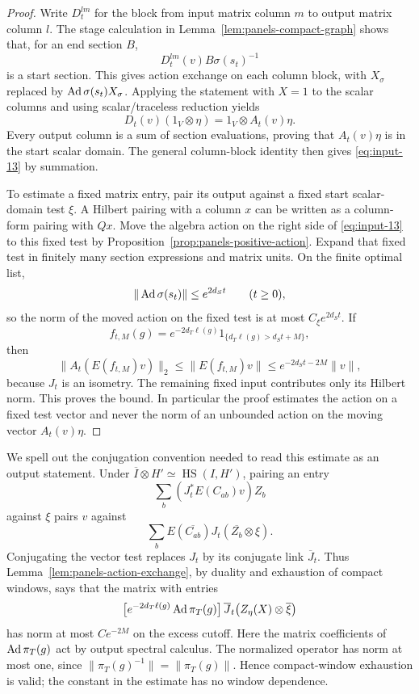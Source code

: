 \begin{proof}
Write $D_t^{lm}$ for the block from input matrix column $m$ to output
matrix column $l$.  The stage calculation in
Lemma~\ref{lem:panels-compact-graph} shows that, for an end section $B$,
\[
 D_t^{lm}(v)B\sigma(s_t)^{-1}
\]
is a start section.  This gives action exchange on each column block,
with $X_\sigma$ replaced by
$\operatorname{Ad}\sigma(s_t)X_\sigma$.  Applying the statement with $X=1$ to the
scalar columns and using scalar/traceless reduction yields
\[
 D_t(v)(1_V\otimes\eta)=1_V\otimes A_t(v)\eta.
\]
Every output column is a sum of section evaluations, proving that
$A_t(v)\eta$ is in the start scalar domain.  The general column-block
identity then gives \eqref{eq:input-13} by summation.

To estimate a fixed matrix entry, pair its output against a fixed
start scalar-domain test $\xi$.  A Hilbert pairing with a column $x$
can be written as a column-form pairing with $Qx$.  Move the algebra
action on the right side of \eqref{eq:input-13} to this fixed test by
Proposition~\ref{prop:panels-positive-action}.  Expand that fixed test
in finitely many section expressions and matrix units.  On the finite
optimal list,
\[
 \|\operatorname{Ad}\sigma(s_t)\|\leq e^{2d_St}\qquad(t\geq0),
\]
so the norm of the moved action on the fixed test is at most
$C_\xi e^{2d_St}$.  If
\[
 f_{t,M}(g)=e^{-2d_T\ell(g)}
             1_{\{d_T\ell(g)>d_St+M\}},
\]
then
\[
 \|A_t(E(f_{t,M})v)\|_2
 \leq\|E(f_{t,M})v\|
 \leq e^{-2d_St-2M}\|v\|,
\]
because $J_t$ is an isometry.  The remaining fixed input contributes
only its Hilbert norm.  This proves the bound.  In particular the proof
estimates the action on a fixed test vector and never the norm of an
unbounded action on the moving vector $A_t(v)\eta$.
\end{proof}

We spell out the conjugation convention needed to read this estimate as
an output statement.  Under
$\overline I\otimes H'\simeq\operatorname{HS}(I,H')$, pairing an
entry
\[
 \sum_b (J_t^*E(C_{ab})v)Z_b
\]
against $\xi$ pairs $v$ against
\[
 \sum_b E(\overline{C_{ab}})
                J_t(\overline{Z_b}\otimes\xi).
\]
Conjugating the vector test replaces $J_t$ by its conjugate link
$\overline J_t$.  Thus Lemma~\ref{lem:panels-action-exchange}, by
duality and exhaustion of compact windows, says that the matrix with
entries
\begin{equation}\label{eq:panels-conjugate-bound}
 \bigl[e^{-2d_T\ell(g)}\operatorname{Ad}\pi_T(g)\bigr]\,
       \overline J_t\bigl(Z_\eta(X)\otimes\overline\xi\bigr)
\end{equation}
has norm at most $Ce^{-2M}$ on the excess cutoff.  Here the matrix
coefficients of $\operatorname{Ad}\pi_T(g)$ act by output spectral calculus.  The
normalized operator has norm at most one, since
$\|\pi_T(g)^{-1}\|=\|\pi_T(g)\|$.  Hence compact-window exhaustion
is valid; the constant in the estimate has no window dependence.

